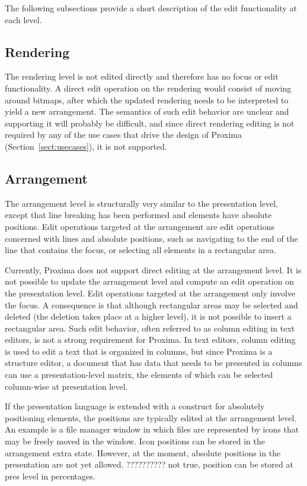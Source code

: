 The following subsections provide a short description of the edit functionality at each level. 
 
 
%																
\subsection{Rendering}

The rendering level is not edited directly and therefore has no focus or edit functionality. A direct edit operation on the rendering would consist of moving around bitmaps, after which the updated rendering needs to be interpreted to yield a new arrangement. The semantics of such edit behavior are unclear and supporting it will probably be difficult, and since direct rendering editing is not required by any of the use cases that drive the design of Proxima (Section~\ref{sect:usecases}), it is not supported.
  

%																
\subsection{Arrangement}\label{sect:editArr} 

The arrangement level is structurally very similar to the presentation level, except that line breaking has been performed and elements have absolute positions. Edit operations targeted at the arrangement are edit operations concerned with lines and absolute positions, such as navigating to the end of the line that contains the focus, or selecting all elements in a rectangular area.

Currently, Proxima does not support direct editing at the arrangement level. It is not possible to update the arrangement level and compute an edit operation on the presentation level. Edit operations targeted at the arrangement only involve the focus. A consequence is that although rectangular areas may be selected and deleted (the deletion takes place at a higher level), it is not possible to insert a rectangular area. Such edit behavior, often referred to as column editing in text editors, is not a strong requirement for Proxima. In text editors, column editing is used to edit a text that is organized in columns, but since Proxima is a structure editor, a document that has data that needs to be presented in columns can use a presentation-level matrix, the elements of which can be selected column-wise at presentation level.

\bc
If the presentation language is extended with a construct for absolutely positioning elements, the positions are typically edited at the arrangement level. An example is a  file manager window in which files are represented by icons that may be freely moved in  the window. Icon positions can be stored in the arrangement extra state. However, at the  moment, absolute positions in the presentation are not yet allowed. 
?????????? not true, position can be stored at pres level in percentages.
\ec


